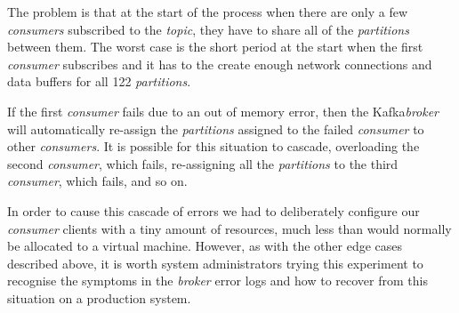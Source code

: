 \documentclass{article}
\newcommand{\kafka} {Kafka\xspace}
\newcommand{\kftopic} {\textit{topic}\xspace}
\newcommand{\kfbroker} {\textit{broker}\xspace}
\newcommand{\kfconsumer} {\textit{consumer}\xspace}
\newcommand{\kfconsumers} {\textit{consumers}\xspace}
\newcommand{\kfpartitions} {\textit{partitions}\xspace}
\begin{document}
The problem is that at the start of the process when there are only a few \kfconsumers subscribed to the \kftopic, they have to share all of the \kfpartitions between them.
The worst case is the short period at the start when the first \kfconsumer subscribes and it has to the create enough network connections and data buffers for all 122 \kfpartitions.

If the first \kfconsumer fails due to an out of memory error, then the \kafka \kfbroker will automatically re-assign the \kfpartitions assigned to the failed \kfconsumer to other \kfconsumers. It is possible for this situation to cascade, overloading the second \kfconsumer, which fails, re-assigning all the \kfpartitions to the third \kfconsumer, which fails, and so on.

In order to cause this cascade of errors we had to deliberately configure our \kfconsumer clients with a tiny amount of resources, much less than would normally be allocated to a virtual machine.
However, as with the other edge cases described above, it is worth system administrators trying this experiment to recognise the symptoms in the \kfbroker error logs and how to recover from this situation on a production system.

\printbibliography
\end{document}
